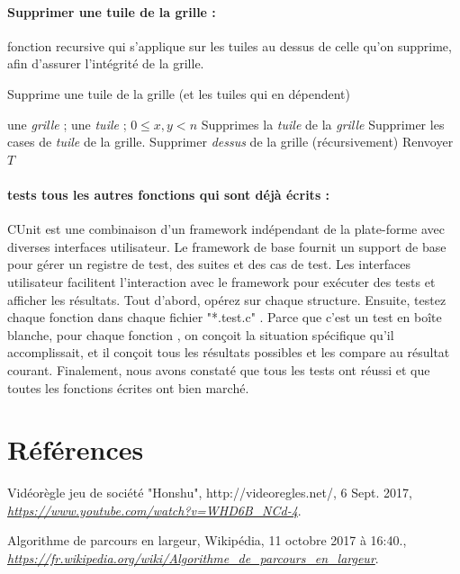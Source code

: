 \documentclass[10pt]{article}
\begin{document}
				\newpage
				\paragraph{Supprimer une tuile de la grille :}
					fonction recursive qui s'applique sur les tuiles au dessus de celle qu'on supprime, afin d'assurer l'intégrité de la grille.
					\begin{algorithm}
						\caption{Supprime une tuile de la grille (et les tuiles qui en dépendent)}
						\begin{algorithmic}
							\REQUIRE une \textit{grille} ; une \textit{tuile} ; $0 \leq x, y < n$
							\ENSURE Supprimes la \textit{tuile} de la \textit{grille}
							\STATE Supprimer les cases de \textit{tuile} de la grille.
									\STATE Supprimer \textit{dessus} de la grille (récursivement)
								\ENDIF
							\ENDFOR
							\STATE Renvoyer $T$
						\end{algorithmic}
					\end{algorithm}

					\paragraph{tests tous les autres fonctions qui sont déjà écrits :}
					CUnit est une combinaison d'un framework indépendant de la plate-forme avec diverses interfaces utilisateur. Le framework de base fournit un support de base pour gérer un registre de test, des suites et des cas de test. Les interfaces utilisateur facilitent l'interaction avec le framework pour exécuter des tests et afficher les résultats.
					Tout d'abord, opérez sur chaque structure. Ensuite, testez chaque fonction dans chaque fichier "*.test.c" . Parce que c'est un test en boîte blanche, pour chaque fonction , on conçoit la situation spécifique qu'il accomplissait, et il conçoit tous les résultats possibles et les compare au résultat courant. Finalement, nous avons constaté que tous les tests ont réussi et que toutes les fonctions écrites ont bien marché. 

	\newpage
	
	\section{Références}
		\begin{thebibliography}{}
				Vidéorègle jeu de société "Honshu",\newline
				http://videoregles.net/, 6 Sept. 2017,\newline
				\href{https://www.youtube.com/watch?v=WHD6B\_NCd-4}{\textit{https://www.youtube.com/watch?v=WHD6B\_NCd-4}}.

				Algorithme de parcours en largeur,\newline
				Wikipédia, 11 octobre 2017 à 16:40.,\newline
				\href{https://fr.wikipedia.org/wiki/Algorithme\_de\_parcours\_en\_largeur}{\textit{https://fr.wikipedia.org/wiki/Algorithme\_de\_parcours\_en\_largeur}}.
    
		\end{thebibliography}
\end{document}
